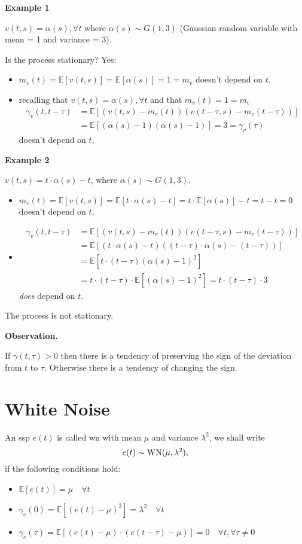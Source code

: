\textbf{Example 1}

$v(t,s)=\alpha (s),\forall t$ where $\alpha (s)\sim G(1,3)$ (Gaussian random variable with mean = 1 and variance = 3).

Is the process stationary? Yes:
\begin{itemize}
	\item $m_{v}(t)=\mathbb{E}[v(t, s)]=\mathbb{E}[\alpha(s)]=1=m_{v}$ doesn't depend on $t$.
	\item recalling that $v(t, s)=\alpha(s), \forall t$ and that $m_{v}(t)=1=m_{v}$
	\begin{align*}
		\gamma_{v}(t, t-\tau)&=\mathbb{E}[(v(t, s)-m_{v}(t))(v(t-\tau, s)-m_{v}(t-\tau))]\\
		&=\mathbb{E}[(\alpha(s)-1)(\alpha(s)-1)]=3=\gamma_{v}(\tau)
	\end{align*}
	 doesn't depend on $t$.
\end{itemize}

\textbf{Example 2}

$v(t, s)=t \cdot \alpha(s)-t$, where $\alpha(s) \sim G(1,3)$.
\begin{itemize}
	\item $m_{v}(t)=\mathbb{E}[v(t, s)]=\mathbb{E}[t \cdot \alpha(s)-t]=t \cdot \mathbb{E}[\alpha(s)]-t=t-t=0$ doesn't depend on $t$.
	\item \begin{align*}
		\gamma_{v}(t, t-\tau)&=\mathbb{E}[(v(t, s)-m_{v}(t))(v(t-\tau, s)-m_{v}(t-\tau))]\\
	&=\mathbb{E}[(t \cdot \alpha(s)-t)((t-\tau) \cdot \alpha(s)-(t-\tau))]\\
	&=\mathbb{E}[t \cdot(t-\tau)(\alpha(s)-1)^{2}]\\
	&=t \cdot(t-\tau) \cdot \mathbb{E}[(\alpha(s)-1)^{2}]=t \cdot(t-\tau) \cdot 3
	\end{align*}
	\emph{does} depend on $t$.
\end{itemize}
The process is not stationary.

\textbf{Observation.}

If $\gamma(t, \tau)>0$ then there is a tendency of preserving the sign of the deviation from $t$ to $\tau $. Otherwise there is a tendency of changing the sign.

\section{White Noise}

An \gls{ssp} $e(t)$ is called \gls{wn} with mean $\mu$ and variance $\lambda^{2}$, we shall write
\[
	e(t) \sim \operatorname{WN}(\mu, \lambda^{2}),
\]
if the following conditions hold:
\begin{itemize}
	\item $\mathbb{E}[e(t)]=\mu \quad \forall t$
	\item $\gamma_{e}(0)=\mathbb{E}[(e(t)-\mu)^{2}]=\lambda^{2} \quad \forall t$
	\item $\gamma_{e}(\tau)=\mathbb{E}[(e(t)-\mu) \cdot(e(t-\tau)-\mu)]=0 \quad \forall t, \forall \tau \neq 0$
\end{itemize}


